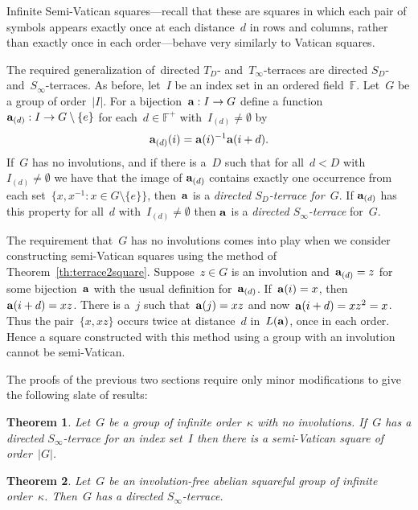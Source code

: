 \documentclass[12pt,a4paper]{article}
\newtheorem{thm}{Theorem}[section]
\newcommand{\F}{\mathbb{F}}
\begin{document}
Infinite Semi-Vatican squares---recall that these are squares in which each pair of symbols appears exactly once at each distance~$d$ in rows and columns, rather than exactly once in each order---behave very similarly to Vatican squares.  

The required generalization of~directed $T_{D}$- and~$T_{\infty}$-terraces are directed $S_{D}$- and~$S_{\infty}$-terraces.  As before, let~$I$ be an index set in an ordered field~$\F$.  Let~$G$ be a group of order~$|I|$.  For a bijection~${\bf a}: I \rightarrow G$ define a function~${\bf a}_{(d)}: I \rightarrow G \setminus \{ e \}$ for each~$d \in \F^+$ with~$I_{(d)} \neq \emptyset$ by
$${\bf a}_{(d)}(i) = {\bf a}(i)^{-1}{\bf a}(i+d).$$
If~$G$ has no involutions, and if there is a~$D$ such that for all~$d < D$ with~$I_{(d)} \neq \emptyset$ we have that the image of ${\bf a}_{(d)}$ contains exactly one occurrence from each set~$\{ x,x^{-1} : x \in G\setminus \{e\} \}$, then~${\bf a}$ is a {\em directed $S_D$-terrace for~$G$}.  If ${\bf a}_{(d)}$ has this property for all~$d$ with~$I_{(d)} \neq \emptyset$ then ${\bf a}$ is  a {\em directed $S_{\infty}$-terrace} for~$G$.

The requirement that~$G$ has no involutions comes into play when we consider constructing semi-Vatican squares using the method of Theorem~\ref{th:terrace2square}.  Suppose~$z \in G$ is an involution and~${\bf a}_{(d)} = z$ for some bijection~${\bf a}$ with the usual definition for~${\bf a}_{(d)}$.  If~${\bf a}(i) = x$, then ${\bf a}(i+d) = xz$.  There is a~$j$ such that~${\bf a}(j) = xz$ and now~${\bf a}(i+d) = xz^2 = x$.  Thus the pair~$\{ x, xz \}$ occurs twice at distance~$d$ in~$L({\bf a})$, once in each order.  Hence a square constructed with this method using a group with an involution cannot be semi-Vatican.



The proofs of the previous two sections require only minor modifications to give the following slate of results:

\begin{thm}\label{th:semi_terrace2square}
Let~$G$ be a group of infinite order~$\kappa$ with no involutions.  If~$G$ has a directed $S_{\infty}$-terrace for an index set~$I$ then there is a semi-Vatican square of order~$|G|$.
\end{thm}

\begin{thm}\label{th:semi_T_infty}
Let~$G$ be an involution-free abelian squareful group of infinite order~$\kappa$.   Then~$G$ has a directed $S_{\infty}$-terrace.
\end{thm}
\end{document}
